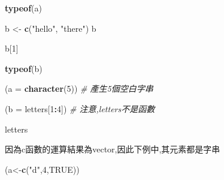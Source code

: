 \documentclass[]{book}
\newenvironment{Shaded}{\begin{snugshade}}{\end{snugshade}}
\newcommand{\KeywordTok}[1]{\textcolor[rgb]{0.13,0.29,0.53}{\textbf{#1}}}
\newcommand{\DataTypeTok}[1]{\textcolor[rgb]{0.13,0.29,0.53}{#1}}
\newcommand{\DecValTok}[1]{\textcolor[rgb]{0.00,0.00,0.81}{#1}}
\newcommand{\StringTok}[1]{\textcolor[rgb]{0.31,0.60,0.02}{#1}}
\newcommand{\CommentTok}[1]{\textcolor[rgb]{0.56,0.35,0.01}{\textit{#1}}}
\newcommand{\OtherTok}[1]{\textcolor[rgb]{0.56,0.35,0.01}{#1}}
\newcommand{\OperatorTok}[1]{\textcolor[rgb]{0.81,0.36,0.00}{\textbf{#1}}}
\newcommand{\NormalTok}[1]{#1}
\theoremstyle{definition}
\theoremstyle{definition}
\theoremstyle{definition}
\theoremstyle{remark}
\begin{document}
\begin{Shaded}
\begin{Highlighting}[]
\KeywordTok{typeof}\NormalTok{(a)}
\end{Highlighting}
\end{Shaded}

\begin{Shaded}
\begin{Highlighting}[]
\NormalTok{b <-}\StringTok{ }\KeywordTok{c}\NormalTok{(}\StringTok{"hello"}\NormalTok{, }\StringTok{"there"}\NormalTok{)}
\NormalTok{b}
\end{Highlighting}
\end{Shaded}

\begin{Shaded}
\begin{Highlighting}[]
\NormalTok{b[}\DecValTok{1}\NormalTok{]}
\end{Highlighting}
\end{Shaded}

\begin{Shaded}
\begin{Highlighting}[]
\KeywordTok{typeof}\NormalTok{(b)}
\end{Highlighting}
\end{Shaded}

\begin{Shaded}
\begin{Highlighting}[]
\NormalTok{(}\DataTypeTok{a =} \KeywordTok{character}\NormalTok{(}\DecValTok{5}\NormalTok{)) }\CommentTok{# 產生5個空白字串}
\end{Highlighting}
\end{Shaded}

\begin{Shaded}
\begin{Highlighting}[]
\NormalTok{(}\DataTypeTok{b =}\NormalTok{ letters[}\DecValTok{1}\OperatorTok{:}\DecValTok{4}\NormalTok{]) }\CommentTok{# 注意,letters不是函數}
\end{Highlighting}
\end{Shaded}

\begin{Shaded}
\begin{Highlighting}[]
\NormalTok{letters}
\end{Highlighting}
\end{Shaded}

因為c函數的運算結果為vector,因此下例中,其元素都是字串

\begin{Shaded}
\begin{Highlighting}[]
\NormalTok{ (a<-}\KeywordTok{c}\NormalTok{(}\StringTok{"d"}\NormalTok{,}\DecValTok{4}\NormalTok{,}\OtherTok{TRUE}\NormalTok{))}
\end{Highlighting}
\end{Shaded}
\end{document}
